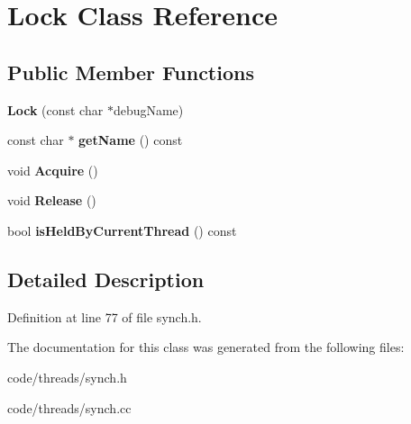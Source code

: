 \section{Lock Class Reference}
\label{class_lock}
\subsection*{Public Member Functions}
\begin{DoxyCompactItemize}
\item 
{\bfseries Lock} (const char $\ast$debug\+Name)\label{class_lock_afe45a309ecbd6b3346db887a76f0a9cf}

\item 
const char $\ast$ {\bfseries get\+Name} () const \label{class_lock_ad31cd7d145c782f4fefafe71277ba6cd}

\item 
void {\bfseries Acquire} ()\label{class_lock_ad4c4699fd1ab73f3927b10edc01c54db}

\item 
void {\bfseries Release} ()\label{class_lock_a5ca005b84272e56c2bf447056ee9217c}

\item 
bool {\bfseries is\+Held\+By\+Current\+Thread} () const \label{class_lock_a90db4d305ded28ee12ed08cd4c3c4d8a}

\end{DoxyCompactItemize}


\subsection{Detailed Description}


Definition at line 77 of file synch.\+h.



The documentation for this class was generated from the following files\+:\begin{DoxyCompactItemize}
\item 
code/threads/synch.\+h\item 
code/threads/synch.\+cc\end{DoxyCompactItemize}
